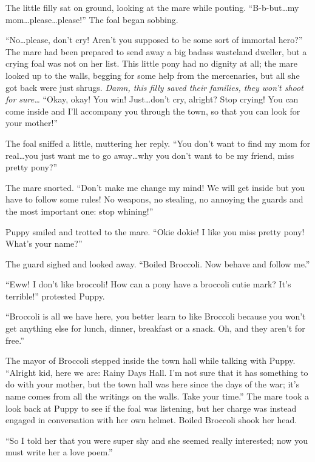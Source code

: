 The little filly sat on ground, looking at the mare while pouting. ``B-b-but\dots my mom\dots please\dots please!'' The foal began sobbing.

``No\dots please, don't cry! Aren't you supposed to be some sort of immortal hero?'' The mare had been prepared to send away a big badass wasteland dweller, but a crying foal was not on her list. This little pony had no dignity at all; the mare looked up to the walls, begging for some help from the mercenaries, but all she got back were just shrugs. \emph{Damn, this filly saved their families, they won't shoot for sure\dots} ``Okay, okay! You win! Just\dots don't cry, alright? Stop crying! You can come inside and I'll accompany you through the town, so that you can look for your mother!''

The foal sniffed a little, muttering her reply. ``You don't want to find my mom for real\dots you just want me to go away\dots why you don't want to be my friend, miss pretty pony?''

The mare snorted. ``Don't make me change my mind! We will get inside but you have to follow some rules! No weapons, no stealing, no annoying the guards and the most important one: stop whining!''

Puppy smiled and trotted to the mare. ``Okie dokie! I like you miss pretty pony! What's your name?''

The guard sighed and looked away. ``Boiled Broccoli. Now behave and follow me.''

``Eww! I don't like broccoli! How can a pony have a broccoli cutie mark? It's terrible!'' protested Puppy.

``Broccoli is all we have here, you better learn to like Broccoli because you won't get anything else for lunch, dinner, breakfast or a snack. Oh, and they aren't for free.''

\horizonline


The mayor of Broccoli stepped inside the town hall while talking with Puppy. ``Alright kid, here we are: Rainy Days Hall. I'm not sure that it has something to do with your mother, but the town hall was here since the days of the war; it's name comes from all the writings on the walls. Take your time.'' The mare took a look back at Puppy to see if the foal was listening, but her charge was instead engaged in conversation with her own helmet. Boiled Broccoli shook her head.

``So I told her that you were super shy and she seemed really interested; now you must write her a love poem.''

